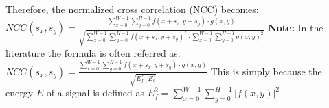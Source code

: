 \documentclass{article}
\begin{document}
\newline\newline
Therefore, the normalized cross correlation (NCC) becomes:
\newline\newline
$NCC(s_x, s_y) = \frac{\sum_{x=0}^{W-1} \sum_{y=0}^{H-1} f(x+s_x,y+s_y) \cdot g(x,y)}{\sqrt{\sum_{x=0}^{W-1} \sum_{y=0}^{H-1} f(x+s_x, y+s_y)^2 \cdot \sum_{x=0}^{W-1} \sum_{y=0}^{H-1} g(x, y)^2}}$
\newline\newline\newline
\textbf{Note:} In the literature the formula is often referred as:
\newline\newline
$NCC(s_x, s_y) = \frac{\sum_{x=0}^{W-1} \sum_{y=0}^{H-1} f(x+s_x,y+s_y) \cdot g(x,y)}{\sqrt{E_f^2 \cdot E_g^2}}$
\newline
This is simply because the energy $E$ of a signal is defined as $E_f^2 = \sum_{x=0}^{W-1} \sum_{y=0}^{H-1} |f(x,y)|^2$
\end{document}

